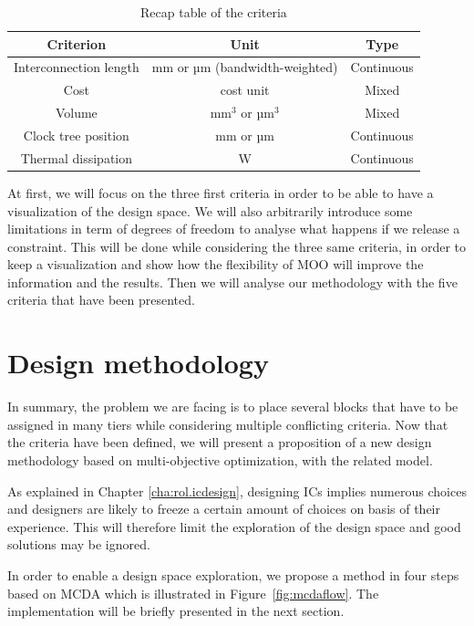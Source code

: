 \begin{table}
\caption{Recap table of the criteria}
\begin{center}
\begin{tabular}{|c|c|c|}
\hline
Criterion & Unit & Type\\
\hline
Interconnection length & mm or µm (bandwidth-weighted) & Continuous\\
Cost & cost unit & Mixed\\
Volume & mm$^3$ or µm$^3$ & Mixed\\
Clock tree position & mm or µm & Continuous\\
Thermal dissipation & W & Continuous\\
\hline
\end{tabular}
\end{center}
\label{tab:critrecap}
\end{table}


At first, we will focus on the three first criteria in order to be able to have a visualization of the design space. We will also arbitrarily introduce some limitations in term of degrees of freedom to analyse what happens if we release a constraint. This will be done while considering the three same criteria, in order to keep a visualization and show how the flexibility of MOO will improve the information and the results. Then we will analyse our methodology with the five criteria that have been presented.

\section{Design methodology}
In summary, the problem we are facing is to place several blocks that have to be assigned in many tiers while considering multiple conflicting criteria. Now that the criteria have been defined, we will present a proposition of a new design methodology based on multi-objective optimization, with the related model.

As explained in Chapter \ref{cha:rol.icdesign}, designing ICs implies numerous choices and designers are likely to freeze a certain amount of choices on basis of their experience. This will therefore limit the exploration of the design space and good solutions may be ignored.

In order to enable a design space exploration, we propose a method in four steps based on MCDA which is illustrated in Figure~\ref{fig:mcdaflow}. The implementation will be briefly presented in the next section.

